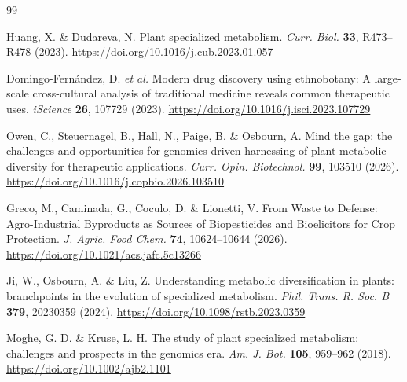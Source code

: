 \documentclass[11pt,a4paper]{article}
\begin{document}
\clearpage
\begin{thebibliography}{99}
\setlength{\itemsep}{0pt}

Huang, X. \& Dudareva, N. Plant specialized metabolism. \textit{Curr. Biol.} \textbf{33}, R473--R478 (2023). \url{https://doi.org/10.1016/j.cub.2023.01.057}

Domingo-Fern\'andez, D. \textit{et al.} Modern drug discovery using ethnobotany: A large-scale cross-cultural analysis of traditional medicine reveals common therapeutic uses. \textit{iScience} \textbf{26}, 107729 (2023). \url{https://doi.org/10.1016/j.isci.2023.107729}

Owen, C., Steuernagel, B., Hall, N., Paige, B. \& Osbourn, A. Mind the gap: the challenges and opportunities for genomics-driven harnessing of plant metabolic diversity for therapeutic applications. \textit{Curr. Opin. Biotechnol.} \textbf{99}, 103510 (2026). \url{https://doi.org/10.1016/j.copbio.2026.103510}

Greco, M., Caminada, G., Coculo, D. \& Lionetti, V. From Waste to Defense: Agro-Industrial Byproducts as Sources of Biopesticides and Bioelicitors for Crop Protection. \textit{J. Agric. Food Chem.} \textbf{74}, 10624--10644 (2026). \url{https://doi.org/10.1021/acs.jafc.5c13266}

Ji, W., Osbourn, A. \& Liu, Z. Understanding metabolic diversification in plants: branchpoints in the evolution of specialized metabolism. \textit{Phil. Trans. R. Soc. B} \textbf{379}, 20230359 (2024). \url{https://doi.org/10.1098/rstb.2023.0359}

Moghe, G. D. \& Kruse, L. H. The study of plant specialized metabolism: challenges and prospects in the genomics era. \textit{Am. J. Bot.} \textbf{105}, 959--962 (2018). \url{https://doi.org/10.1002/ajb2.1101}


\end{thebibliography}
\end{document}
